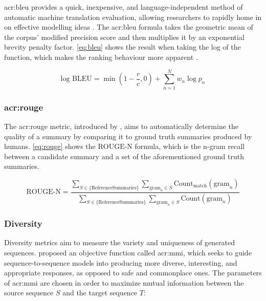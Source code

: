 \gls{acr:bleu} provides a quick, inexpensive, and language-independent method of automatic machine translation evaluation, allowing researchers to rapidly home in on effective modelling ideas \citep{papineniBleuMethodAutomatic2002}. The \gls{acr:bleu} formula takes the geometric mean of the corpus' modified precision score and then multiplies it by an exponential brevity penalty factor. \eqref{eq:bleu} shows the result when taking the log of the function, which makes the ranking behaviour more apparent \citep[5]{papineniBleuMethodAutomatic2002}.

\begin{equation}
    \text{log BLEU} = \min\left(1 - \frac{r}{c}, 0\right) + \sum_{n=1}^{N} w_n \log p_n
    \label{eq:bleu}
\end{equation}

\subsubsection[Recall-Oriented Understudy (ROUGE)]{\acrfull{acr:rouge}}

The \gls{acr:rouge} metric, introduced by \cite{linROUGEPackageAutomatic2004}, aims to automatically determine the quality of a summary by comparing it to ground truth summaries produced by humans. \eqref{eq:rouge} shows the $\text{ROUGE-N}$ formula, which is the n-gram recall between a candidate summary and a set of the aforementioned ground truth summaries.

\begin{equation}
    \text{ROUGE-N} = \frac{
    \sum_{S \in \{\text{ReferenceSummaries}\}}
    \sum_{\text{gram}_n \in S}
    \text{Count}_{\text{match}}(\text{gram}_n)
    }{
    \sum_{S \in \{\text{ReferenceSummaries}\}}
    \sum_{\text{gram}_n \in S}
    \text{Count}(\text{gram}_n)
    }
    \label{eq:rouge}
\end{equation}

\subsubsection{Diversity}

Diversity metrics aim to measure the variety and uniqueness of generated sequences. \cite{liDiversityPromotingObjectiveFunction2016} proposed an objective function called \gls{acr:mmi}, which seeks to guide sequence-to-sequence models into producing more diverse, interesting, and appropriate responses, as opposed to safe and commonplace ones. The parameters of \gls{acr:mmi} are chosen in order to maximize mutual information between the source sequence $S$ and the target sequence $T$:

